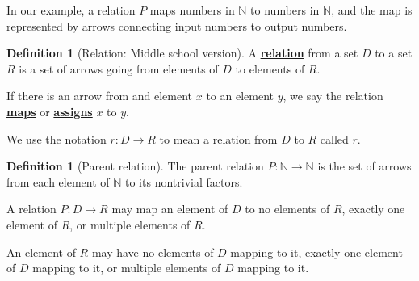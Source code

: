 \documentclass[11pt]{article}
\newcommand{\N}{\mathbb{N}}
\renewcommand\emph[1]{\underline{\bf{#1}}} %
\theoremstyle{definition}
\newtheorem{definition}[theorem]{Definition}
\begin{document}
\vspace*{-12pt} 
In our example, a relation $P$ maps numbers in $\N$ to numbers in $\N$, and the map is represented by arrows connecting input numbers to output numbers. 

\begin{definition}[Relation: Middle school version]\label{d: relation middle school}
A \emph{relation} from a set $D$ to a set $R$ is a set of arrows going from elements of $D$ to elements of $R$.  


If there is an arrow from and element $x$ to an element $y$, we say the relation \emph{maps} or \emph{assigns} $x$ to $y$.
\end{definition}

We use the notation $r:D\to R$ to mean a relation from $D$ to $R$ called $r$.

\begin{definition}[Parent relation]\label{d: parent relation}
The parent relation $P:\N\to\N$ is the set of arrows from each element of $\N$ to its nontrivial factors.
\end{definition}

\begin{note}
A relation $P:D\to R$ may map an element of $D$ to no elements of $R$, exactly one element of $R$, or multiple elements of $R$. 

An element of $R$ may have no elements of $D$ mapping to it, exactly one element of $D$ mapping to it, or multiple elements of $D$ mapping to it.
\end{note}
\end{document}

